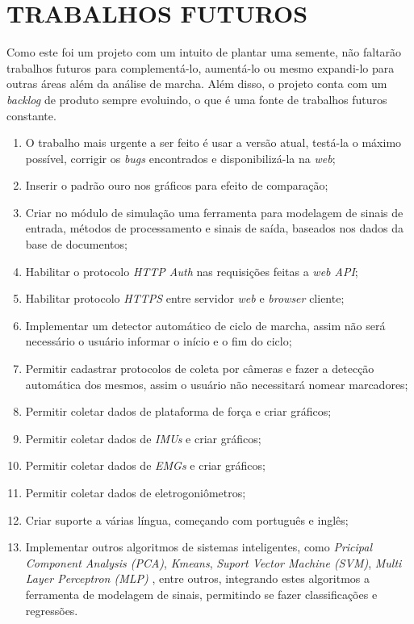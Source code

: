 \chapter[TRABALHOS FUTUROS]{\textbf{TRABALHOS FUTUROS}}
Como este foi um projeto com um intuito de plantar uma semente, não faltarão trabalhos futuros para complementá-lo, aumentá-lo ou mesmo expandi-lo para outras áreas além da análise de marcha. Além disso, o projeto conta com um \emph{backlog} de produto sempre evoluindo, o que é uma fonte de trabalhos futuros constante.
\begin{enumerate}
	\item O trabalho mais urgente a ser feito é usar a versão atual, testá-la o máximo possível, corrigir os \emph{bugs} encontrados e disponibilizá-la na \emph{web};
	\item Inserir o padrão ouro nos gráficos para efeito de comparação;
	\item Criar no módulo de simulação uma ferramenta para modelagem de sinais de entrada, métodos de processamento e sinais de saída, baseados nos dados da base de documentos;
	\item Habilitar o protocolo \emph{HTTP Auth} nas requisições feitas a \emph{web API};
	\item Habilitar protocolo \emph{HTTPS} entre servidor \emph{web} e \emph{browser} cliente;
	\item Implementar um detector automático de ciclo de marcha, assim não será necessário o usuário informar o início e o fim do ciclo;
	\item Permitir cadastrar protocolos de coleta por câmeras e fazer a detecção automática dos mesmos, assim o usuário não necessitará nomear marcadores;
	\item Permitir coletar dados de plataforma de força e criar gráficos;
	\item Permitir coletar dados de \emph{IMUs} e criar gráficos;
	\item Permitir coletar dados de \emph{EMGs} e criar gráficos;
	\item Permitir coletar dados de eletrogoniômetros;
	\item Criar suporte a várias língua, começando com português e inglês;
	\item Implementar outros algoritmos de sistemas inteligentes, como \emph{Pricipal Component Analysis (PCA)}, \emph{Kmeans}, \emph{Suport Vector Machine (SVM)}, \emph{Multi Layer Perceptron (MLP)} \cite{Haykin1998}, entre outros, integrando estes algoritmos a ferramenta de modelagem de sinais, permitindo se fazer classificações e regressões. 

\end{enumerate}
